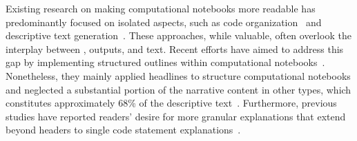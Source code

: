 Existing research on making computational notebooks more readable has predominantly focused on isolated aspects, such as code organization~\cite{head2019managing, weinman2021fork, wang2022stickyland} and descriptive text generation~\cite{lin2023inksight,wang2022documentation}.
These approaches, while valuable, often overlook the interplay between , outputs, and text.
Recent efforts have aimed to address this gap by implementing structured outlines within computational notebooks~\cite{chattopadhyay2023make, rule2018aiding}. 
Nonetheless, they mainly applied headlines to structure computational notebooks and neglected a substantial portion of the narrative content in other types, which constitutes approximately 68\% of the descriptive text~\cite{wang2022documentation}.
Furthermore, previous studies have reported readers' desire for more granular explanations that extend beyond headers to single code statement explanations~\cite{chattopadhyay2023make}.


